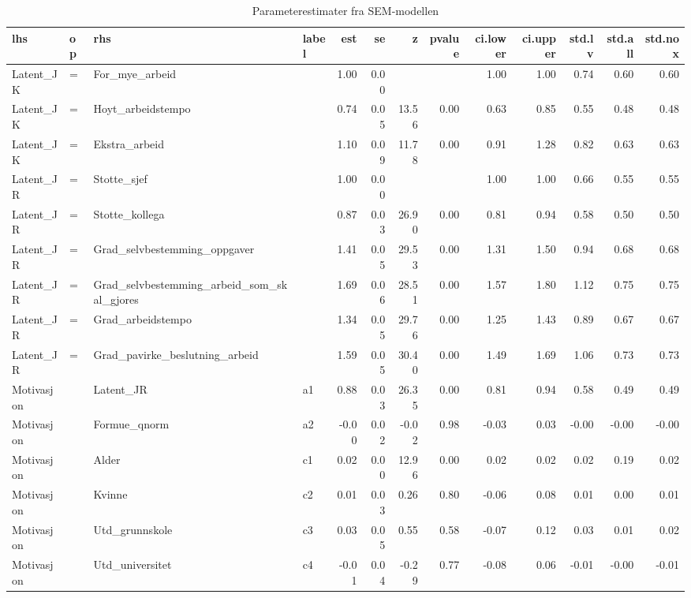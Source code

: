 \documentclass[
  12pt,
  a4paper,
  DIV=11,
  numbers=noendperiod]{scrartcl}
\begin{document}
\clearpage

\begin{table}[ht]
\centering
\caption{Parameterestimater fra SEM-modellen} 
\label{tab:sem_estimater}
\begin{tabular}{llllrrrrrrrrr}
  \toprule
lhs & op & rhs & label & est & se & z & pvalue & ci.lower & ci.upper & std.lv & std.all & std.nox \\ 
  \midrule
Latent\_JK & =~ & For\_mye\_arbeid &  & 1.00 & 0.00 &  &  & 1.00 & 1.00 & 0.74 & 0.60 & 0.60 \\ 
  Latent\_JK & =~ & Hoyt\_arbeidstempo &  & 0.74 & 0.05 & 13.56 & 0.00 & 0.63 & 0.85 & 0.55 & 0.48 & 0.48 \\ 
  Latent\_JK & =~ & Ekstra\_arbeid &  & 1.10 & 0.09 & 11.78 & 0.00 & 0.91 & 1.28 & 0.82 & 0.63 & 0.63 \\ 
  Latent\_JR & =~ & Stotte\_sjef &  & 1.00 & 0.00 &  &  & 1.00 & 1.00 & 0.66 & 0.55 & 0.55 \\ 
  Latent\_JR & =~ & Stotte\_kollega &  & 0.87 & 0.03 & 26.90 & 0.00 & 0.81 & 0.94 & 0.58 & 0.50 & 0.50 \\ 
  Latent\_JR & =~ & Grad\_selvbestemming\_oppgaver &  & 1.41 & 0.05 & 29.53 & 0.00 & 1.31 & 1.50 & 0.94 & 0.68 & 0.68 \\ 
  Latent\_JR & =~ & Grad\_selvbestemming\_arbeid\_som\_skal\_gjores &  & 1.69 & 0.06 & 28.51 & 0.00 & 1.57 & 1.80 & 1.12 & 0.75 & 0.75 \\ 
  Latent\_JR & =~ & Grad\_arbeidstempo &  & 1.34 & 0.05 & 29.76 & 0.00 & 1.25 & 1.43 & 0.89 & 0.67 & 0.67 \\ 
  Latent\_JR & =~ & Grad\_pavirke\_beslutning\_arbeid &  & 1.59 & 0.05 & 30.40 & 0.00 & 1.49 & 1.69 & 1.06 & 0.73 & 0.73 \\ 
  Motivasjon & ~ & Latent\_JR & a1 & 0.88 & 0.03 & 26.35 & 0.00 & 0.81 & 0.94 & 0.58 & 0.49 & 0.49 \\ 
  Motivasjon & ~ & Formue\_qnorm & a2 & -0.00 & 0.02 & -0.02 & 0.98 & -0.03 & 0.03 & -0.00 & -0.00 & -0.00 \\ 
  Motivasjon & ~ & Alder & c1 & 0.02 & 0.00 & 12.96 & 0.00 & 0.02 & 0.02 & 0.02 & 0.19 & 0.02 \\ 
  Motivasjon & ~ & Kvinne & c2 & 0.01 & 0.03 & 0.26 & 0.80 & -0.06 & 0.08 & 0.01 & 0.00 & 0.01 \\ 
  Motivasjon & ~ & Utd\_grunnskole & c3 & 0.03 & 0.05 & 0.55 & 0.58 & -0.07 & 0.12 & 0.03 & 0.01 & 0.02 \\ 
  Motivasjon & ~ & Utd\_universitet & c4 & -0.01 & 0.04 & -0.29 & 0.77 & -0.08 & 0.06 & -0.01 & -0.00 & -0.01 \\ 

\end{tabular}
\end{table}
\end{document}
